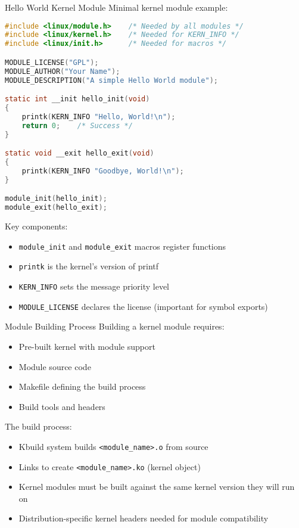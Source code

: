 \begin{code}{Hello World Kernel Module}
    Minimal kernel module example:
    
\begin{lstlisting}[language=C, style=basesmol]
#include <linux/module.h>    /* Needed by all modules */
#include <linux/kernel.h>    /* Needed for KERN_INFO */
#include <linux/init.h>      /* Needed for macros */

MODULE_LICENSE("GPL");
MODULE_AUTHOR("Your Name");
MODULE_DESCRIPTION("A simple Hello World module");

static int __init hello_init(void)
{
    printk(KERN_INFO "Hello, World!\n");
    return 0;    /* Success */
}

static void __exit hello_exit(void)
{
    printk(KERN_INFO "Goodbye, World!\n");
}

module_init(hello_init);
module_exit(hello_exit);
\end{lstlisting}

    Key components:
    \begin{itemize}
        \item \texttt{module\_init} and \texttt{module\_exit} macros register functions
        \item \texttt{printk} is the kernel's version of printf
        \item \texttt{KERN\_INFO} sets the message priority level
        \item \texttt{MODULE\_LICENSE} declares the license (important for symbol exports)
    \end{itemize}
\end{code}

\begin{definition}{Module Building Process}
    Building a kernel module requires:
    \begin{itemize}
        \item Pre-built kernel with module support
        \item Module source code
        \item Makefile defining the build process
        \item Build tools and headers
    \end{itemize}
    
    The build process:
    \begin{itemize}
        \item Kbuild system builds \texttt{<module\_name>.o} from source
        \item Links to create \texttt{<module\_name>.ko} (kernel object)
        \item Kernel modules must be built against the same kernel version they will run on
        \item Distribution-specific kernel headers needed for module compatibility
    \end{itemize}
\end{definition}

